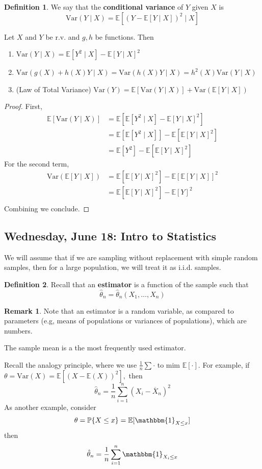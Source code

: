 \documentclass[10pt, oneside]{article}
\newcommand{\bbP}{\mathbb{P}}
\newcommand{\Var}{\text{Var}}
\newcommand{\bbE}{\mathbb{E}}
\theoremstyle{definition}
\newtheorem{defn}{Definition}
\newtheorem{rem}{Remark}
\begin{document}
\begin{defn}
    We say that the \textbf{conditional variance} of $Y$ given $X$ is 
    \[\Var(Y \mid X) = \bbE[(Y - \bbE[Y \mid X])^2 \mid X]\]
\end{defn}

\begin{lemma}
    Let $X$ and $Y$ be r.v. and $g,h$ be functions. Then 
    \begin{enumerate}
        \item $\Var(Y \mid X) = \bbE[Y^2 \mid X] - \bbE[Y \mid X]^2$
        \item $\Var(g(X) + h(X) Y \mid X) = \Var(h(X) Y \mid X) = h^2(X)\Var(Y \mid X)$
        \item (Law of Total Variance)
        $\Var(Y) = \bbE[\Var(Y \mid X)] + \Var(\bbE[Y \mid X])$
    \end{enumerate}
\end{lemma}
\begin{proof}
First, 
    \begin{align*}
        \bbE[\Var(Y \mid X)] &= \bbE[\bbE[Y^2 \mid X] - \bbE[Y \mid X]^2]\\
        &= \bbE[\bbE[Y^2 \mid X]] - \bbE[\bbE[Y \mid X]^2]\\
        &= \bbE[Y^2] - \bbE[\bbE[Y \mid X]^2]
    \end{align*}
For the second term,
\begin{align*}
    \Var(\bbE[Y \mid X]) &= \bbE[\bbE[Y \mid X]^2] - \bbE[\bbE[Y \mid X]]^2\\
    &= \bbE[\bbE[Y \mid X]^2] - \bbE[Y]^2\\
\end{align*}
Combining we conclude.
\end{proof}

\newpage
\subsection*{Wednesday, June 18: Intro to Statistics}


We will assume that if we are sampling without replacement with simple random samples, then for a large population, we will treat it as i.i.d. samples. 
\begin{defn}
    Recall that an \textbf{estimator} is a function of the sample such that 
    \[\hat{\theta}_n = \hat{\theta}_n(X_1, \dots, X_n) \]
\end{defn}
\begin{rem}
    Note that an estimator is a random variable, as compared to parameters (e.g, means of populations or variances of populations), which are numbers. 

    The sample mean is a the most frequently used estimator. 

    Recall the analogy principle, where we use $\frac{1}{n}\sum \cdot$ to mim $\bbE[\cdot].$ For example, if $\theta = \Var(X) = \bbE[(X - \bbE(X))^2],$ then 
    \[\hat{\theta}_n = \frac{1}{n} \sum_{i=1}^n (X_i - \overline{X}_n)^2\] As another example, consider 
    \[\theta = \bbP\{X \leq x\} = \bbE[\mathbbm{1}_{X \leq x}]\] then 
    \[\hat{\theta}_n = \frac{1}{n} \sum_{i=1}^n \mathbbm{1}_{X_i \leq x}\]
\end{rem}
\end{document}
